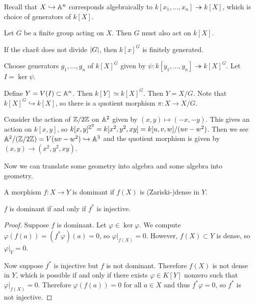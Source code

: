 \documentclass[twoside, 10pt]{article}
\begin{document}
    Recall that $X \hookrightarrow \mathbb{A}^n$ corresponds algebraically to $k[x_1, \ldots, x_n] \twoheadrightarrow k[X]$, which is choice of generators of $k[X]$.

    Let $G$ be a finite group acting on $X$. Then $G$ must also act on $k[X]$.
    \begin{thm}
        If the $\mathrm{char} k$ does not divide $\lvert G\rvert$, then $k[x]^G$ is finitely generated.
    \end{thm}
    Choose generators $g_1, \ldots, g_n$ of $k[X]^G$ given by $\psi: k[y_1, \ldots, y_n] \twoheadrightarrow k[X]^G$. Let $I = \ker \psi$.
    \begin{defn}
        Define $Y = V(I) \subset \mathbb{A}^n$. Then $k[Y] \simeq k[X]^G$. Then $Y = X/G$. Note that $k[X]^G \hookrightarrow k[X]$, so there is a quotient morphism $\pi: X \rightarrow X/G$.
    \end{defn}
    

    \begin{exm}
        Consider the action of $\mathbb{Z}/2\mathbb{Z}$ on $\mathbb{A}^2$ given by $(x,y) \mapsto (-x,-y)$. This gives an action on $k[x,y]$, so $k[x,y]^{\mathbb{Z}^2} = k[x^2,y^2,xy] = k[u,v,w]/(uv-w^2)$. Then we see $\mathbb{A}^2/(\mathbb{Z}/2\mathbb{Z}) = V(uv-w^2) \hookrightarrow \mathbb{A}^3$ and the quotient morphism is given by $(x,y) \rightarrow (x^2,y^2,xy)$.
    \end{exm}

    Now we can translate some geometry into algebra and some algebra into geometry.

    \begin{defn}[Dominance]
        A morphism $f:X \rightarrow Y$ is dominant if $f(X)$ is (Zariski-)dense in $Y$.
    \end{defn}

    \begin{prop}
        $f$ is dominant if and only if $f^*$ is injective.
        \begin{proof}
            Suppose $f$ is dominant. Let $\varphi \in \ker \varphi$. We compute $\varphi(f(a)) = (f^*\varphi)(a) = 0$, so $\varphi |_{f(X)} = 0$. However, $f(X) \subset Y$ is dense, so $\varphi|_Y = 0$.  

            Now suppose $f^*$ is injective but $f$ is not dominant. Therefore $f(X)$ is not dense in $Y$, which is possible if and only if there exists $\varphi \in K[Y]$ nonzero such that $\varphi|_{f(X)} = 0$. Therefore $\varphi(f(a)) = 0$ for all $a \in X$ and thus $f^*\varphi = 0$, so $f^*$ is not injective. 
        \end{proof}
    \end{prop}
\end{document}
